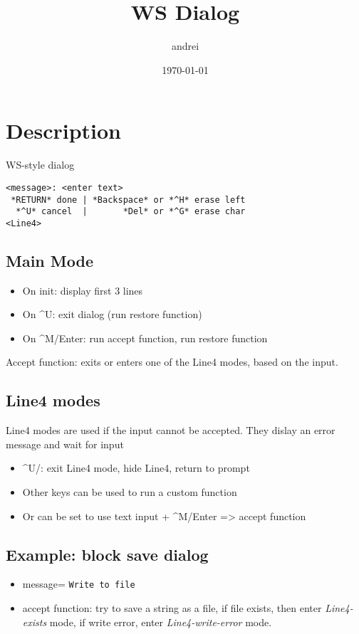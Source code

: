 \documentclass[11pt]{article}
\author{andrei}
\date{\today}
\title{WS Dialog}
\begin{document}
\maketitle

\section{Description}
\label{sec-1}
WS-style dialog

\begin{verbatim}
<message>: <enter text>
 *RETURN* done | *Backspace* or *^H* erase left
  *^U* cancel  |       *Del* or *^G* erase char
<Line4>
\end{verbatim}

\subsection{Main Mode}
\label{sec-1-1}
\begin{itemize}
\item On init: display first 3 lines
\item On \^{}U: exit dialog (run restore function)
\item On \^{}M/Enter: run accept function, run restore function
\end{itemize}

Accept function: exits or enters one of the Line4 modes, based on the
input.

\subsection{Line4 modes}
\label{sec-1-2}
Line4 modes are used if the input cannot be accepted.  They dislay an
error message and wait for input 
\begin{itemize}
\item \^{}U/: exit Line4 mode, hide Line4, return to prompt
\item Other keys can be used to run a custom function
\item Or can be set to use text input + \^{}M/Enter => accept function
\end{itemize}

\subsection{Example: block save dialog}
\label{sec-1-3}
\begin{itemize}
\item message= \texttt{Write to file}
\item accept function: try to save a string as a file, if file exists,
then enter \emph{Line4-exists} mode, if write error, enter
\emph{Line4-write-error} mode.
\end{itemize}
\end{document}
